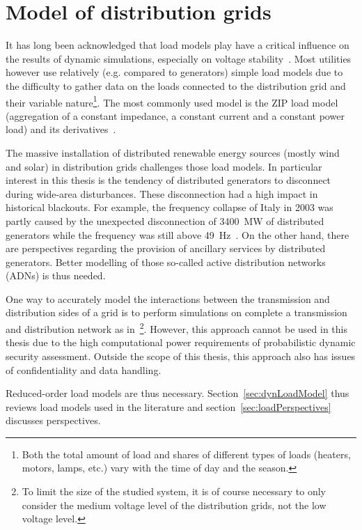 \chapter{Model of distribution grids}
\label{ch:distrib}
\minitoc

It has long been acknowledged that load models play have a critical influence on the results of dynamic simulations, especially on voltage stability~\cite{kundur}. Most utilities however use relatively (e.g. compared to generators) simple load models due to the difficulty to gather data on the loads connected to the distribution grid and their variable nature\footnote{Both the total amount of load and shares of different types of loads (heaters, motors, lamps, etc.) vary with the time of day and the season.}. The most commonly used model is the ZIP load model (aggregation of a constant impedance, a constant current and a constant power load) and its derivatives~\cite{IndustryLoadModel}.

The massive installation of distributed renewable energy sources (mostly wind and solar) in distribution grids challenges those load models. In particular interest in this thesis is the tendency of distributed generators to disconnect during wide-area disturbances. These disconnection had a high impact in historical blackouts. For example, the frequency collapse of Italy in 2003 was partly caused by the unexpected disconnection of 3400~MW of distributed generators while the frequency was still above 49~Hz~\cite[p115]{Italy2003}. On the other hand, there are perspectives regarding the provision of ancillary services by distributed generators. Better modelling of those so-called active distribution networks (ADNs) is thus needed.

One way to accurately model the interactions between the transmission and distribution sides of a grid is to perform simulations on complete a transmission and distribution network as in~\cite{FullTDexample}\footnote{To limit the size of the studied system, it is of course necessary to only consider the medium voltage level of the distribution grids, not the low voltage level.}. However, this approach cannot be used in this thesis due to the high computational power requirements of probabilistic dynamic security assessment. Outside the scope of this thesis, this approach also has issues of confidentiality and data handling.


Reduced-order load models are thus necessary. Section~\ref{sec:dynLoadModel} thus reviews load models used in the literature%
and section~\ref{sec:loadPerspectives} discusses perspectives.

